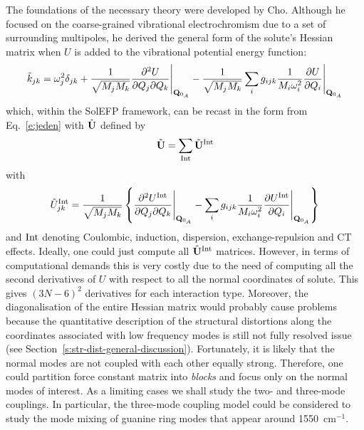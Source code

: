 \documentclass[a4paper,titlepage,twoside,fleqn,12pt]{book}
\newcommand{\fderiv}[2]{\ensuremath{
    \frac{\partial #1}{\partial #2}}}
\newcommand{\sderivd}[3]{\ensuremath{
    \frac{\partial^2 #1}{\partial #2 \partial #3}
    }}
\begin{document}
\begin{refsection}
The foundations of the necessary theory were developed
by Cho. \citep{Cho.JCP.2009} Although he focused on the coarse\hyp{}grained
vibrational electrochromism due to a set of surrounding
multipoles, he derived the general form of the solute's
Hessian matrix when $U$ is added to the vibrational potential
energy function:
%
\begin{equation} 
 \tilde{k}_{jk} = \omega_j^2 \delta_{jk} + \frac{1}{\sqrt{M_jM_k}}\sderivd{U}{Q_j}{Q_k}  \Bigg|_{{\bf Q}_{0_A}} 
                           - \frac{1}{\sqrt{M_jM_k}}\sum_i g_{ijk} 
                             \frac{1}{M_i\omega_i^2}\fderiv{U}{Q_i}          \Bigg|_{{\bf Q}_{0_A}}        
\end{equation}
%
which, within the SolEFP framework, can be recast in
the form from Eq.~\eqref{e:jeden} with $\tilde{\bf U}$
defined by
%
\begin{equation} \label{e:dwa}
 \tilde{\bf U} = \sum_{\rm Int} \tilde{\bf U}^{\rm Int}
\end{equation}
%
with
%
\begin{equation}  \label{e:trzy}
 \tilde{U}^{\rm Int}_{jk} = \frac{1}{\sqrt{M_jM_k}} \left\{
            \sderivd{U^{\rm Int}}{Q_j}{Q_k}  \Bigg|_{{\bf Q}_{0_A}} 
           - \sum_i g_{ijk} \frac{1}{M_i\omega_i^2}\fderiv{U^{\rm Int}}{Q_i} \Bigg|_{{\bf Q}_{0_A}} 
           \right\}
\end{equation}
%
and $\rm Int$ denoting Coulombic, induction, dispersion, exchange\hyp{}repulsion
and CT effects. 
Ideally, one could just compute all
$\tilde{\bf U}^{\rm Int}$ matrices. However, in terms of
computational demands this is very costly due to the
need of computing all the second derivatives of $U$
with respect to all the normal coordinates of solute.
This gives $(3N-6)^2$ derivatives for each interaction
type. Moreover, the diagonalisation of the entire Hessian
matrix would probably cause problems because the quantitative
description of the structural distortions
along the coordinates associated with low frequency modes
is still not fully resolved issue (see Section~\ref{s:str-dist-general-discussion}). 
Fortunately, it is likely that the normal modes
are not coupled with each other equally strong. Therefore,
one could partition force constant matrix into \emph{blocks}
and focus only on the normal modes of interest. As a limiting
cases we shall study the two\hyp{} and three\hyp{}mode
couplings. 
In particular, the three\hyp{}mode coupling model 
could be considered to study the mode mixing of
guanine ring modes that appear around 1550~cm$^{-1}$.


\end{refsection}
\end{document}
